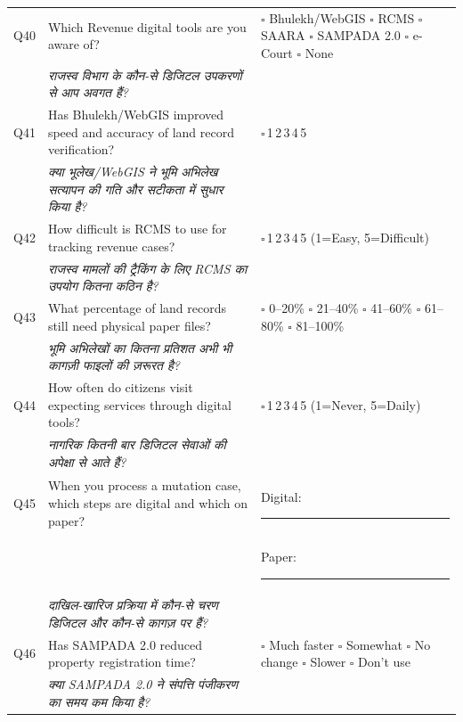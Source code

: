 \documentclass[10pt,a4paper]{article}
\newcommand{\likert}{{\Large$\square$}\,1\quad{\Large$\square$}\,2\quad{\Large$\square$}\,3\quad{\Large$\square$}\,4\quad{\Large$\square$}\,5}
\begin{document}
\noindent\begin{tabularx}{\textwidth}{@{}L{0.8cm} X L{5.2cm}@{}}
Q40 & Which Revenue digital tools are you aware of? & {\Large$\square$} Bhulekh/WebGIS {\Large$\square$} RCMS {\Large$\square$} SAARA {\Large$\square$} SAMPADA 2.0 {\Large$\square$} e-Court {\Large$\square$} None \\
 & {\hindifont\small\itshape\color{black!70} राजस्व विभाग के कौन-से डिजिटल उपकरणों से आप अवगत हैं?} & \\[3pt]
Q41 & Has Bhulekh/WebGIS improved speed and accuracy of land record verification? & \likert \\
 & {\hindifont\small\itshape\color{black!70} क्या भूलेख/WebGIS ने भूमि अभिलेख सत्यापन की गति और सटीकता में सुधार किया है?} & \\[3pt]
Q42 & How difficult is RCMS to use for tracking revenue cases? & \likert{} {\scriptsize(1=Easy, 5=Difficult)} \\
 & {\hindifont\small\itshape\color{black!70} राजस्व मामलों की ट्रैकिंग के लिए RCMS का उपयोग कितना कठिन है?} & \\[3pt]
Q43 & What percentage of land records still need physical paper files? & {\Large$\square$} 0--20\% {\Large$\square$} 21--40\% {\Large$\square$} 41--60\% {\Large$\square$} 61--80\% {\Large$\square$} 81--100\% \\
 & {\hindifont\small\itshape\color{black!70} भूमि अभिलेखों का कितना प्रतिशत अभी भी कागज़ी फाइलों की ज़रूरत है?} & \\[3pt]
Q44 & How often do citizens visit expecting services through digital tools? & \likert{} {\scriptsize(1=Never, 5=Daily)} \\
 & {\hindifont\small\itshape\color{black!70} नागरिक कितनी बार डिजिटल सेवाओं की अपेक्षा से आते हैं?} & \\[3pt]
Q45 & When you process a mutation case, which steps are digital and which on paper? & Digital: \rule{5cm}{0.4pt}\\[2pt] && Paper: \rule{5cm}{0.4pt} \\
 & {\hindifont\small\itshape\color{black!70} दाखिल-खारिज प्रक्रिया में कौन-से चरण डिजिटल और कौन-से कागज़ पर हैं?} & \\[3pt]
Q46 & Has SAMPADA 2.0 reduced property registration time? & {\Large$\square$} Much faster {\Large$\square$} Somewhat {\Large$\square$} No change {\Large$\square$} Slower {\Large$\square$} Don't use \\
 & {\hindifont\small\itshape\color{black!70} क्या SAMPADA 2.0 ने संपत्ति पंजीकरण का समय कम किया है?} & \\[3pt]

\end{tabularx}
\end{document}
